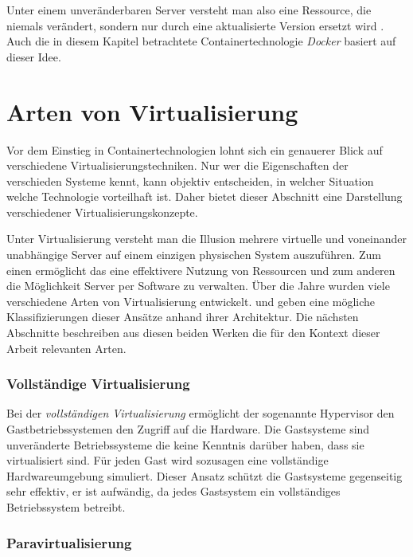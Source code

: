 Unter einem unveränderbaren Server versteht man also eine Ressource, die niemals verändert, sondern nur durch eine aktualisierte Version ersetzt wird \cite{ImmutableServer}. Auch die in diesem Kapitel betrachtete Containertechnologie \textit{Docker} basiert auf dieser Idee.

\section{Arten von Virtualisierung}

Vor dem Einstieg in Containertechnologien lohnt sich ein genauerer Blick auf verschiedene Virtualisierungstechniken. Nur wer die Eigenschaften der verschieden Systeme kennt, kann objektiv entscheiden, in welcher Situation welche Technologie vorteilhaft ist. Daher bietet dieser Abschnitt eine Darstellung verschiedener Virtualisierungskonzepte.

Unter Virtualisierung versteht man die Illusion mehrere virtuelle und voneinander unabhängige Server auf einem einzigen physischen System auszuführen. Zum einen ermöglicht das eine effektivere Nutzung von Ressourcen und zum anderen die Möglichkeit Server per Software zu verwalten. Über die Jahre wurden viele verschiedene Arten von Virtualisierung entwickelt. \cite{VirtualizationBasics} und \cite{Smith:2005:AVM:1069588.1069632} geben eine mögliche Klassifizierungen dieser Ansätze anhand ihrer Architektur. Die nächsten Abschnitte beschreiben aus diesen beiden Werken die für den Kontext dieser Arbeit relevanten Arten.

\subsubsection{Vollständige Virtualisierung}

Bei der \textit{vollständigen Virtualisierung} ermöglicht der sogenannte Hypervisor den Gastbetriebssystemen den Zugriff auf die Hardware. Die Gastsysteme sind unveränderte Betriebssysteme die keine Kenntnis darüber haben, dass sie virtualisiert sind. Für jeden Gast wird sozusagen eine vollständige Hardwareumgebung simuliert. Dieser Ansatz schützt die Gastsysteme gegenseitig sehr effektiv, er ist aufwändig, da jedes Gastsystem ein vollständiges Betriebssystem betreibt.

\subsubsection{Paravirtualisierung}


